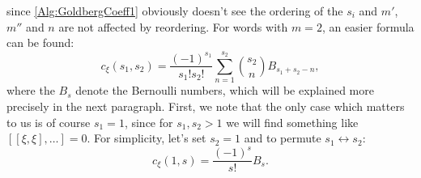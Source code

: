 since \eqref{Alg:GoldbergCoeff1} obviously doesn't see the ordering of the 
$s_i$ and $m'$, $m''$ and $n$ are not affected by reordering. For words with 
$m = 2$, an easier formula can be found:
\begin{equation*}
	c_{\xi}(s_1, s_2) 
	= 
	\frac{ (-1)^{s_1} }{s_1! s_2!} 
	\sum\limits_{n = 1}^{s_2} 
	\binom{s_2}{n} B_{s_1 + s_2 - n},
\end{equation*}
where the $B_s$ denote the Bernoulli numbers, which will be explained more 
precisely in the next paragraph. First, we note that the only case which 
matters to us is of course $s_1 = 1$, since for $s_1, s_2 > 1$ we will find 
something like $[[\xi, \xi], \ldots ] = 0$. For simplicity, let's set 
$s_2 = 1$ and to permute $s_1 \leftrightarrow s_2$:
\begin{equation}
	\label{Alg:GoldbergCoeffBernoulli}
	c_{\xi}(1, s)
	=
	\frac{ (-1)^s }{s!}
	B_s.
\end{equation}


